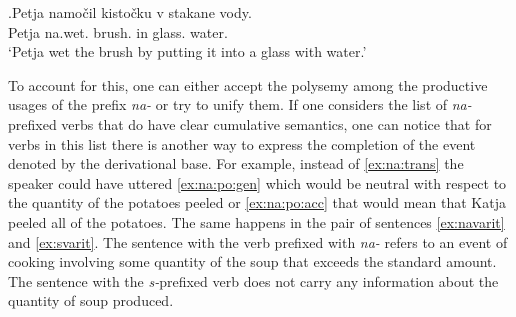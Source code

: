 \exg.\label{ex:namochit}Petja namo\v{c}il kisto\v{c}ku v stakane vody.\\
Petja na.wet. brush. in glass. water.\\
\trans `Petja wet the brush by putting it into a glass with water.'

%
%

To account for this, one can either accept the polysemy among the productive usages of the prefix \textit{na-} or try to unify them. If one considers the list of \textit{na-}prefixed verbs that do have clear cumulative semantics, one can notice that for verbs in this list there is another way to express the completion of the event denoted by the derivational base. For example, instead of \ref{ex:na:trans} the speaker could have uttered \ref{ex:na:po:gen} which would be neutral with respect to the quantity of the potatoes peeled or \ref{ex:na:po:acc} that would mean that Katja peeled all of the potatoes. The same happens in the pair of sentences \ref{ex:navarit} and \ref{ex:svarit}. The sentence with the verb prefixed with \textit{na-} refers to an event of cooking involving some quantity of the soup that exceeds the standard amount. The sentence with the \textit{s-}prefixed verb does not carry any information about the quantity of soup produced.

